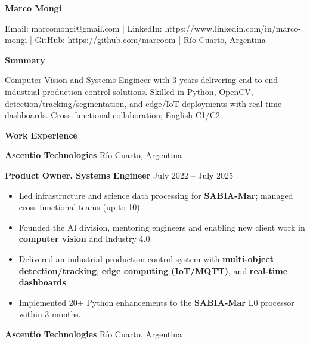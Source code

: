 \documentclass[11pt]{article}
\begin{document}
\begin{center}
    \textbf{Marco Mongi}\\
    \hrulefill
\end{center}

\begin{center}
    Email: marcomongi@gmail.com | LinkedIn: https://www.linkedin.com/in/marco-mongi | GitHub: https://github.com/marcoom | Río Cuarto, Argentina
\end{center}

\vspace{0.5pt}

\begin{center}
    \textbf{Summary}
\end{center}

Computer Vision and Systems Engineer with 3 years delivering end-to-end industrial production-control solutions. Skilled in Python, OpenCV, detection/tracking/segmentation, and edge/IoT deployments with real-time dashboards. Cross-functional collaboration; English C1/C2.

\vspace{12pt}

\begin{center}
    \textbf{Work Experience}
\end{center}

\textbf{Ascentio Technologies} \hfill Río Cuarto, Argentina

\textbf{Product Owner, Systems Engineer} \hfill July 2022 -- July 2025
\begin{itemize}[noitemsep, topsep=0pt, partopsep=0pt, parsep=0pt]
    \item Led infrastructure and science data processing for \textbf{SABIA-Mar}; managed cross-functional teams (up to 10).
    \item Founded the AI division, mentoring engineers and enabling new client work in \textbf{computer vision} and Industry 4.0.
    \item Delivered an industrial production-control system with \textbf{multi-object detection/tracking}, \textbf{edge computing (IoT/MQTT)}, and \textbf{real-time dashboards}.
    \item Implemented 20+ Python enhancements to the \textbf{SABIA-Mar} L0 processor within 3 months.
\end{itemize}

\vspace{12pt}

\textbf{Ascentio Technologies} \hfill Río Cuarto, Argentina
\end{document}

